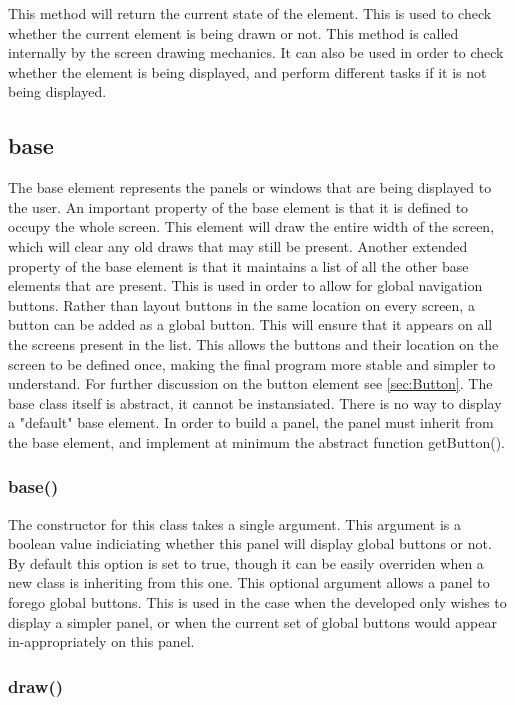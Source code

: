 This method will return the current state of the element. This is used to check whether the current element is being drawn or not. This method is called internally by the screen drawing mechanics. It can also be used in order to check whether the element is being displayed, and perform different tasks if it is not being displayed.

\subsection{base}

The base element represents the panels or windows that are being displayed to the user. An important property of the base element is that it is defined to occupy the whole screen. This element will draw the entire width of the screen, which will clear any old draws that may still be present. Another extended property of the base element is that it maintains a list of all the other base elements that are present. This is used in order to allow for global navigation buttons. Rather than layout buttons in the same location on every screen, a button can be added as a global button. This will ensure that it appears on all the screens present in the list. This allows the buttons and their location on the screen to be defined once, making the final program more stable and simpler to understand.
For further discussion on the button element see \ref{sec:Button}.
The base class itself is abstract, it cannot be instansiated. There is no way to display a "default" base element. In order to build a panel, the panel must inherit from the base element, and implement at minimum the abstract function getButton().

\subsubsection{base()}

The constructor for this class takes a single argument. This argument is a boolean value indiciating whether this panel will display global buttons or not. By default this option is set to true, though it can be easily overriden when a new class is inheriting from this one. This optional argument allows a panel to forego global buttons. This is used in the case when the developed only wishes to display a simpler panel, or when the current set of global buttons would appear in-appropriately on this panel.

\subsubsection{draw()}

